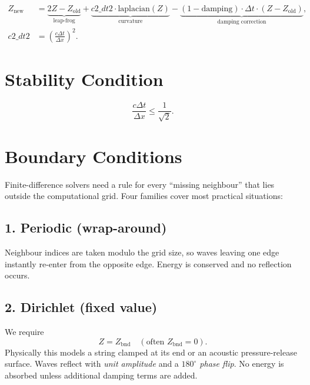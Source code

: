 \documentclass{article}
\begin{document}
\begin{equation}
\begin{aligned}
Z_{\text{new}}
&= \underbrace{2 Z - Z_{\text{old}}}_{\text{leap-frog}}
+ \underbrace{c2\_dt2 \cdot \text{laplacian}(Z)}_{\text{curvature}}
- \underbrace{(1 - \text{damping}) \cdot \Delta t \cdot (Z - Z_{\text{old}})}_{\text{damping correction}}, \\
c2\_dt2 &= \left(\frac{c \Delta t}{\Delta x}\right)^2.
\end{aligned}
\end{equation}

\section*{Stability Condition}

\begin{equation}
\frac{c \Delta t}{\Delta x} \le \frac{1}{\sqrt{2}}.
\end{equation}

\newpage
\section*{Boundary Conditions}
\label{sec:bc-detailed}

Finite-difference solvers need a rule for every “missing neighbour”
that lies outside the computational grid.  Four families cover most
practical situations:

\subsection*{1. Periodic (wrap-around)}

Neighbour indices are taken modulo the grid size, so waves leaving one
edge instantly re-enter from the opposite edge.  Energy is conserved and
no reflection occurs.

\subsection*{2. Dirichlet (fixed value)}

We require
\[
Z = Z_\mathrm{bnd}\quad (\text{often } Z_\mathrm{bnd}=0).
\]
Physically this models a string clamped at its end or an acoustic
pressure-release surface.  Waves reflect with \emph{unit amplitude} and a
\emph{\(180^\circ\) phase flip}.  No energy is absorbed unless additional
damping terms are added.
\end{document}
